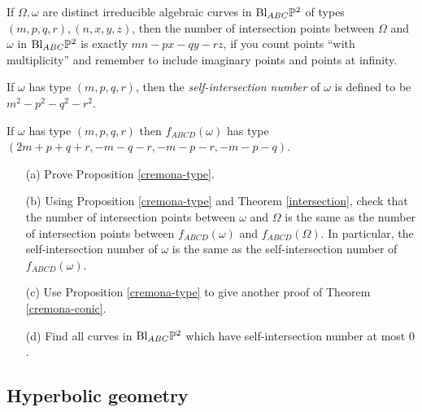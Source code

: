 \begin{thm}\label{intersection} If $\Omega,\omega$ are distinct irreducible algebraic curves in $\text{\rm Bl}_{ABC}\mathbb{P}^2$ of types $(m,p,q,r), (n,x,y,z)$, then the number of intersection points between $\Omega$ and $\omega$ in $\text{\rm Bl}_{ABC}\mathbb{P}^2$ is exactly $mn - px - qy - rz$, if you count points ``with multiplicity'' and remember to include imaginary points and points at infinity.
\end{thm}

\begin{defn} If $\omega$ has type $(m,p,q,r)$, then the \emph{self-intersection number} of $\omega$ is defined to be $m^2 - p^2 - q^2 - r^2$.
\end{defn}

\begin{prop}\label{cremona-type} If $\omega$ has type $(m,p,q,r)$ then $f_{ABCD}(\omega)$ has type $(2m+p+q+r,-m-q-r,-m-p-r,-m-p-q)$.
\end{prop}

\begin{exer}
\begin{itemize}
\item[(a)] Prove Proposition \ref{cremona-type}.

\item[(b)] Using Proposition \ref{cremona-type} and Theorem \ref{intersection}, check that the number of intersection points between $\omega$ and $\Omega$ is the same as the number of intersection points between $f_{ABCD}(\omega)$ and $f_{ABCD}(\Omega)$. In particular, the self-intersection number of $\omega$ is the same as the self-intersection number of $f_{ABCD}(\omega)$.

\item[(c)] Use Proposition \ref{cremona-type} to give another proof of Theorem \ref{cremona-conic}.

\item[(d)] Find all curves in $\text{\rm Bl}_{ABC}\mathbb{P}^2$ which have self-intersection number at most $0$.
\end{itemize}
\end{exer}




\subsection{Hyperbolic geometry}

